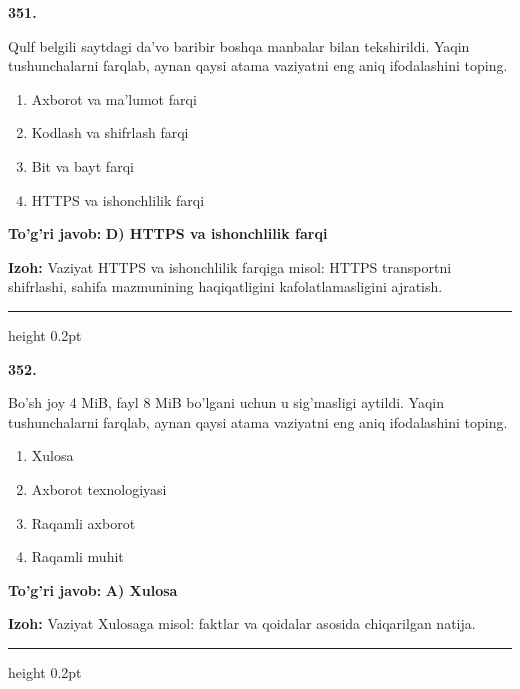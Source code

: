 \documentclass[10pt,a4paper,oneside]{article}
\begin{document}
\noindent\textbf{\color{ink}351.}
\par
Qulf belgili saytdagi da'vo baribir boshqa manbalar bilan tekshirildi. Yaqin tushunchalarni farqlab, aynan qaysi atama vaziyatni eng aniq ifodalashini toping.
\begin{enumerate}[label=\Alph*),leftmargin=9mm]
\item Axborot va ma'lumot farqi
\item Kodlash va shifrlash farqi
\item Bit va bayt farqi
\item HTTPS va ishonchlilik farqi
\end{enumerate}
\begin{tcolorbox}[enhanced,breakable,colback=teal!4,colframe=teal!50!black,boxrule=0.5pt,arc=1.1mm,left=3mm,right=3mm,top=1.7mm,bottom=1.7mm,before skip=2mm,after skip=2mm]
\textbf{\color{teal}To'g'ri javob:} \textbf{D) HTTPS va ishonchlilik farqi}
\par\smallskip
\textbf{Izoh:} Vaziyat HTTPS va ishonchlilik farqiga misol: HTTPS transportni shifrlashi, sahifa mazmunining haqiqatligini kafolatlamasligini ajratish.
\end{tcolorbox}
\vspace{2mm}\hrule height 0.2pt \vspace{3mm}

\noindent\textbf{\color{ink}352.}
\par
Bo'sh joy 4 MiB, fayl 8 MiB bo'lgani uchun u sig'masligi aytildi. Yaqin tushunchalarni farqlab, aynan qaysi atama vaziyatni eng aniq ifodalashini toping.
\begin{enumerate}[label=\Alph*),leftmargin=9mm]
\item Xulosa
\item Axborot texnologiyasi
\item Raqamli axborot
\item Raqamli muhit
\end{enumerate}
\begin{tcolorbox}[enhanced,breakable,colback=teal!4,colframe=teal!50!black,boxrule=0.5pt,arc=1.1mm,left=3mm,right=3mm,top=1.7mm,bottom=1.7mm,before skip=2mm,after skip=2mm]
\textbf{\color{teal}To'g'ri javob:} \textbf{A) Xulosa}
\par\smallskip
\textbf{Izoh:} Vaziyat Xulosaga misol: faktlar va qoidalar asosida chiqarilgan natija.
\end{tcolorbox}
\vspace{2mm}\hrule height 0.2pt \vspace{3mm}
\end{document}
